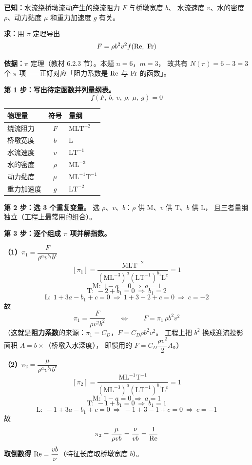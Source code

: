 \begin{jie}
\textbf{已知：}水流绕桥墩流动产生的绕流阻力 $F$ 与桥墩宽度 $b$、
水流速度 $v$、水的密度 $\rho$、动力黏度 $\mu$ 和重力加速度 $g$ 有关。

\textbf{求：}用 $\pi$ 定理导出
\[ F=\rho b^{2}v^{2}f\!\left(\Rey,\ \Fr\right) \]

\textbf{依据：}$\pi$ 定理（教材 6.2.3 节）。本题 $n=6$，$m=3$，
故共有 $N(\pi)=6-3=3$ 个 $\pi$ 项——正好对应「阻力系数是 $\mathrm{Re}$ 与 $\mathrm{Fr}$ 的函数」。

\textbf{第 1 步：写出待定函数并列量纲表。}
\[ f(F,\ b,\ v,\ \rho,\ \mu,\ g)=0 \]

\begin{center}
\begin{tabularx}{\textwidth}{@{}lcX@{}}
\toprule
物理量 & 符号 & 量纲 \\
\midrule
绕流阻力 & $F$ & $\mathrm{MLT^{-2}}$ \\
桥墩宽度 & $b$ & $\mathrm{L}$ \\
水流速度 & $v$ & $\mathrm{LT^{-1}}$ \\
水的密度 & $\rho$ & $\mathrm{ML^{-3}}$ \\
动力黏度 & $\mu$ & $\mathrm{ML^{-1}T^{-1}}$ \\
重力加速度 & $g$ & $\mathrm{LT^{-2}}$ \\
\bottomrule
\end{tabularx}
\end{center}

\textbf{第 2 步：选 3 个重复变量。}
选 $\rho$、$v$、$b$：$\rho$ 供 $\mathrm{M}$、$v$ 供 $\mathrm{T}$、$b$ 供 $\mathrm{L}$，
且三者量纲独立（工程上最常用的组合）。

\textbf{第 3 步：逐个组成 $\pi$ 项并解指数。}

\textbf{（1）$\pi_1=\dfrac{F}{\rho^{a}v^{b_1}b^{c}}$}
\[ [\pi_1]=\frac{\mathrm{MLT^{-2}}}
   {\left(\mathrm{ML^{-3}}\right)^{a}\left(\mathrm{LT^{-1}}\right)^{b_1}\mathrm{L}^{c}}=1 \]
\[ \mathrm{M}:\ 1-a=0\ \Longrightarrow\ a=1 \]
\[ \mathrm{T}:\ -2+b_1=0\ \Longrightarrow\ b_1=2 \]
\[ \mathrm{L}:\ 1+3a-b_1+c=0\ \Longrightarrow\ 1+3-2+c=0\ \Longrightarrow\ c=-2 \]
故
\[ \pi_1=\frac{F}{\rho v^{2}b^{2}}\qquad\Longleftrightarrow\qquad F=\pi_1\,\rho b^{2}v^{2} \]
（这就是\textbf{阻力系数}的来源：$\pi_1=C_D$，$F=C_D\rho b^{2}v^{2}$。
工程上把 $b^{2}$ 换成迎流投影面积 $A=b\times$（桥墩入水深度），
即惯用的 $F=C_D\dfrac{\rho v^{2}}{2}A$。）

\textbf{（2）$\pi_2=\dfrac{\mu}{\rho^{a}v^{b_1}b^{c}}$}
\[ [\pi_2]=\frac{\mathrm{ML^{-1}T^{-1}}}
   {\left(\mathrm{ML^{-3}}\right)^{a}\left(\mathrm{LT^{-1}}\right)^{b_1}\mathrm{L}^{c}}=1 \]
\[ \mathrm{M}:\ 1-a=0\ \Longrightarrow\ a=1 \]
\[ \mathrm{T}:\ -1+b_1=0\ \Longrightarrow\ b_1=1 \]
\[ \mathrm{L}:\ -1+3a-b_1+c=0\ \Longrightarrow\ -1+3-1+c=0\ \Longrightarrow\ c=-1 \]
故
\[ \pi_2=\frac{\mu}{\rho vb}=\frac{\nu}{vb}=\frac{1}{\mathrm{Re}} \]
\textbf{取倒数得} $\mathrm{Re}=\dfrac{vb}{\nu}$（特征长度取桥墩宽度 $b$）。


\end{jie}
